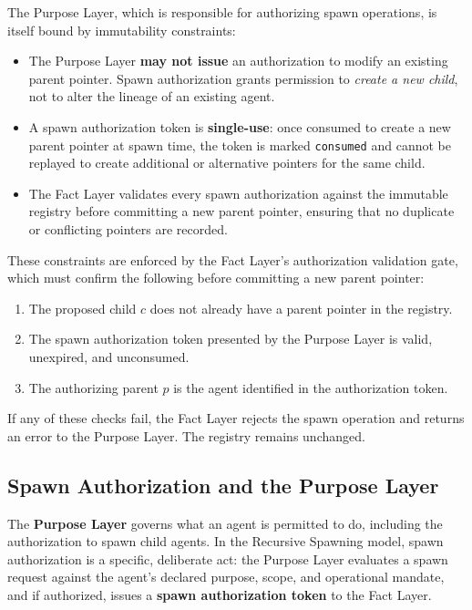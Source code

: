 The Purpose Layer, which is responsible for authorizing spawn operations, is itself bound by immutability constraints:

\begin{itemize}
    \item The Purpose Layer \textbf{may not issue} an authorization to modify an existing parent pointer. Spawn authorization grants permission to \textit{create a new child}, not to alter the lineage of an existing agent.
    \item A spawn authorization token is \textbf{single-use}: once consumed to create a new parent pointer at spawn time, the token is marked \texttt{consumed} and cannot be replayed to create additional or alternative pointers for the same child.
    \item The Fact Layer validates every spawn authorization against the immutable registry before committing a new parent pointer, ensuring that no duplicate or conflicting pointers are recorded.
\end{itemize}

These constraints are enforced by the Fact Layer's authorization validation gate, which must confirm the following before committing a new parent pointer:

\begin{enumerate}
    \item The proposed child \(c\) does not already have a parent pointer in the registry.
    \item The spawn authorization token presented by the Purpose Layer is valid, unexpired, and unconsumed.
    \item The authorizing parent \(p\) is the agent identified in the authorization token.
\end{enumerate}

If any of these checks fail, the Fact Layer rejects the spawn operation and returns an error to the Purpose Layer. The registry remains unchanged.

\subsection{Spawn Authorization and the Purpose Layer}

The \textbf{Purpose Layer} governs what an agent is permitted to do, including the authorization to spawn child agents. In the Recursive Spawning model, spawn authorization is a specific, deliberate act: the Purpose Layer evaluates a spawn request against the agent's declared purpose, scope, and operational mandate, and if authorized, issues a \textbf{spawn authorization token} to the Fact Layer.

